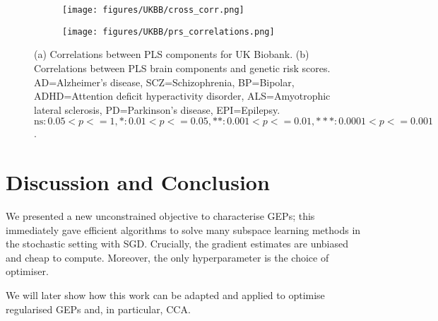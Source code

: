 \begin{figure}
\centering
     \begin{subfigure}[b]{0.27\textwidth}
         \centering
          \texttt{[image: figures/UKBB/cross\_corr.png]}
          \caption{}
          \label{fig:UKBB_corr}
     \end{subfigure}
     \begin{subfigure}[b]{0.72\textwidth}
         \centering
          \texttt{[image: figures/UKBB/prs\_correlations.png]}
          \caption{}
          \label{fig:genetic_risk}
     \end{subfigure}
\caption{(a) Correlations between PLS components for UK Biobank. (b) Correlations between PLS brain components and genetic risk scores. AD=Alzheimer's disease, SCZ=Schizophrenia, BP=Bipolar, ADHD=Attention deficit hyperactivity disorder, ALS=Amyotrophic lateral sclerosis, PD=Parkinson's disease, EPI=Epilepsy. $\text{ns}: 0.05< p <= 1, \ast: 0.01< p <=0.05, \ast\ast: 0.001< p <= 0.01, \ast\ast\ast: 0.0001< p <= 0.001$.}
\end{figure}

\section{Discussion and Conclusion}

We presented a new unconstrained objective to characterise GEPs; this immediately gave efficient algorithms to solve many subspace learning methods in the stochastic setting with SGD.
Crucially, the gradient estimates are unbiased and cheap to compute.
Moreover, the only hyperparameter is the choice of optimiser.

We will later show how this work can be adapted and applied to optimise regularised GEPs and, in particular, CCA.